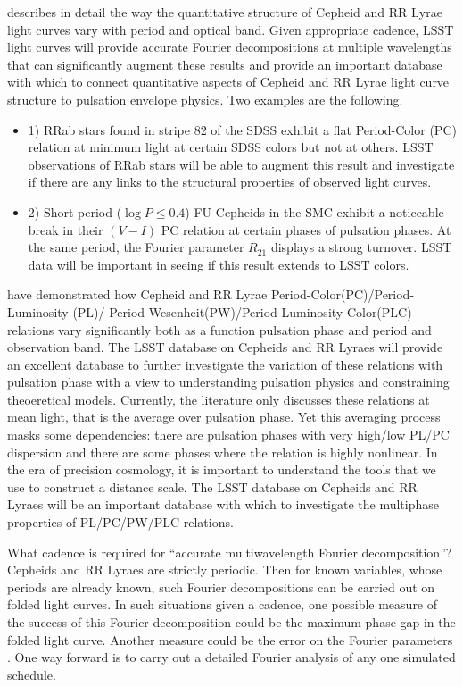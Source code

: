 \citet{2014MNRAS.445.2655B} describes in detail the way the quantitative structure of
Cepheid and RR Lyrae light curves vary with period and optical band. Given
appropriate cadence, LSST light curves will provide accurate Fourier
decompositions at multiple wavelengths that can significantly augment these
results and provide an important database with which to connect quantitative
aspects of Cepheid and RR Lyrae light curve structure to pulsation envelope
physics. Two examples are the following.
\begin{itemize}
\item{1)} RRab stars found in stripe 82 of the
SDSS exhibit a flat Period-Color (PC) relation at minimum light at certain SDSS colors but not at others. LSST observations of RRab stars will be able
to augment this result and investigate if there are any links to the structural properties of observed light curves.
\item{2)} Short period ($\log P \le 0.4$) FU Cepheids in the SMC exhibit a noticeable break in their $(V-I)$ PC relation at certain phases of pulsation
phases. At the same period, the Fourier parameter $R_{21}$ displays a strong turnover. LSST data will be important in seeing if this result extends
to LSST colors.
\end{itemize}

\citet[and references therein]{2014MNRAS.445.2655B,2015MNRAS.447.3342B} have
demonstrated how Cepheid and RR Lyrae
Period-Color(PC)/Period-Luminosity (PL)/
Period-Wesenheit(PW)/Period-Luminosity-Color(PLC) relations vary significantly
both as a function pulsation phase and period and observation band.  The LSST
database on Cepheids and RR Lyraes will provide an excellent database to further
investigate the variation of these relations with pulsation phase with a view
to understanding pulsation physics and constraining theoeretical models.
Currently, the literature only discusses these relations at mean light, that
is the average over pulsation phase. Yet this averaging process masks
some dependencies: there are pulsation phases with very high/low PL/PC
dispersion and there are some phases where the relation is highly nonlinear.
In the era of precision cosmology, it is important to understand the tools that
we use to construct a distance scale. The LSST database on Cepheids and RR
Lyraes will be an important database with which to investigate the multiphase
properties of PL/PC/PW/PLC relations.

What cadence is required for ``accurate multiwavelength Fourier
decomposition''? Cepheids and RR Lyraes are strictly periodic. Then for known variables, whose periods are already known, such
Fourier decompositions can be carried out on folded light curves. In such
situations given a cadence, one possible measure of the success of this Fourier
decomposition could be the maximum phase gap in the folded light curve. Another
measure could be the error on the Fourier parameters
\citep{1986A&A...170...59P}. One way forward is to carry out a detailed
Fourier analysis of any one simulated schedule.


